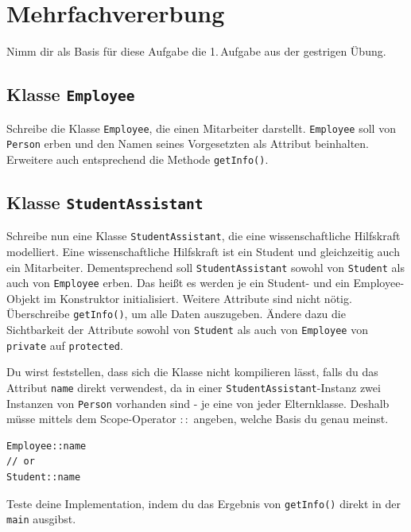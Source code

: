 

\newcommand{\exday}{4}

\cppSetTitle



\cppSetHeaderAndMakeTitle



\section{Mehrfachvererbung}
Nimm dir als Basis für diese Aufgabe die 1.\,Aufgabe aus der gestrigen Übung.

\subsection{Klasse \texttt{Employee}}
Schreibe die Klasse \texttt{Employee}, die einen Mitarbeiter darstellt.
\texttt{Employee} soll von \texttt{Person} erben und den Namen seines Vorgesetzten als Attribut beinhalten.
Erweitere auch entsprechend die Methode \texttt{getInfo()}.

\subsection{Klasse \texttt{StudentAssistant}}
Schreibe nun eine Klasse \texttt{StudentAssistant}, die eine wissenschaftliche Hilfskraft modelliert.
Eine wissenschaftliche Hilfskraft ist ein Student und gleichzeitig auch ein Mitarbeiter.
Dementsprechend soll \texttt{StudentAssistant} sowohl von \texttt{Student} als auch von \texttt{Employee} erben. Das heißt es werden je ein Student- und ein Employee-Objekt im Konstruktor initialisiert.
Weitere Attribute sind nicht nötig.
Überschreibe \texttt{getInfo()}, um alle Daten auszugeben.
Ändere dazu die Sichtbarkeit der Attribute sowohl von \texttt{Student} als auch von \texttt{Employee} von \texttt{private} auf \texttt{protected}.

Du wirst feststellen, dass sich die Klasse nicht kompilieren lässt, falls du das Attribut \texttt{name} direkt verwendest, da in einer \texttt{StudentAssistant}-Instanz zwei Instanzen von \texttt{Person} vorhanden sind - je eine von jeder Elternklasse. Deshalb müsse mittels dem Scope-Operator $::$ angeben, welche Basis du genau meinst.
\begin{lstlisting}
Employee::name
// or
Student::name
\end{lstlisting}

Teste deine Implementation, indem du das Ergebnis von \texttt{getInfo()} direkt in der \texttt{main} ausgibst.


